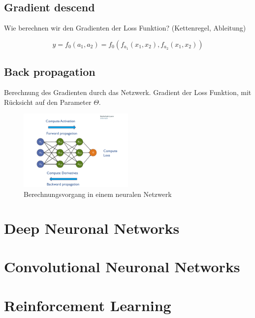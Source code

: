 \documentclass[a4paper]{article}
\begin{document}
		\subsection{Gradient descend}
		
		Wie berechnen wir den Gradienten der Loss Funktion? (Kettenregel, Ableitung)
		
		$$ y = f_{0} ( a_1, a_2 ) = f_0 ( f_{a_1} ( x_1, x_2 ), f_{a_2} ( x_1, x_2 ) ) $$
		
		\newpage
		
		\subsection{Back propagation}
		
		Berechnung des Gradienten durch das Netzwerk. Gradient der Loss Funktion, mit Rücksicht auf den Parameter $\Theta$.
		
		\begin{figure}[htb!]
			\centering
			\includegraphics[width=0.5\textwidth]{img/05_neuronal_networks/back_prop.png}
			\caption{Berechnungsvorgang in einem neuralen Netzwerk}
			\label{fig:05_neuronet_back_prop}
		\end{figure}
		
	
	\section{Deep Neuronal Networks}
	
	
	
	\section{Convolutional Neuronal Networks}
	
	
	
	\section{Reinforcement Learning}
	
	
	
	
\end{document}

